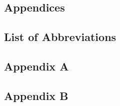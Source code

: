 

\begin{appendices}

\chapter*{Appendices}
\section{List of Abbreviations}

\section{Appendix A}


\section{Appendix B}

\end{appendices}
